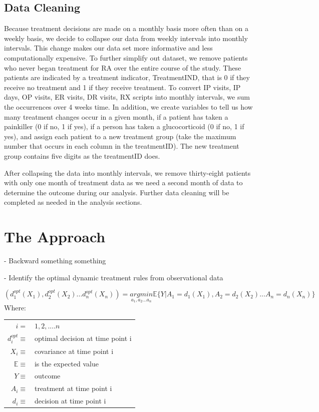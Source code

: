 \documentclass[10pt]{article}
\begin{document}
\subsection{Data Cleaning}

Because treatment decisions are made on a monthly basis more often than on a weekly basis, we decide to collapse our data  from weekly intervals into monthly intervals. This change makes our data set more informative and less computationally expensive. To further simplify out dataset, we remove patients who never began treatment for RA over the entire course of the study. These patients are indicated by a treatment indicator, TreatmentIND, that is 0 if they receive no treatment and 1 if they receive treatment. To convert IP visits, IP days, OP visits, ER visits, DR visits, RX scripts into monthly intervals, we sum the occurrences over 4 weeks time. In addition, we create variables to tell us how many treatment changes occur in a given month, if a patient has taken a painkiller (0 if no, 1 if yes), if a person has taken a glucocorticoid (0 if no, 1 if yes), and assign each patient to a new treatment group (take the maximum number that occurs in each column in the treatmentID). The new treatment group contains five digits as the treatmentID does. 

After collapsing the data into monthly intervals, we remove thirty-eight patients with only one month of treatment data as we need a second month of data to determine the outcome during our analysis. Further data cleaning will be completed as needed in the analysis sections.       
        
\section{The Approach}
- Backward something something

- Identify the optimal dynamic treatment rules from observational data

\begin{equation}
(d^{opt}_1(X_1), d^{opt}_2(X_2) ... d^{opt}_n(X_n)) = \underset{a_1,a_2...a_n}{argmin} \mathds{E}\{Y|A_1=d_1(X_1), A_2=d_2(X_2)...A_n=d_n(X_n)\}
\end{equation}
Where:
\begin{table}[H]
	\centering
	\begin{tabular}{r l}
		$i =$ & $1,2,....n$ \\
		$d_i^{opt} \equiv$ & optimal decision at time point i \\
		$X_i \equiv$ & covariance at time point i \\
		$\mathds{E} \equiv $ & is the expected value \\
		$Y \equiv$ & outcome \\
		$A_i \equiv$ & treatment at time point i \\
		$d_i \equiv$ & decision at time point i \\	
	\end{tabular}
\end{table}
 
\end{document}
